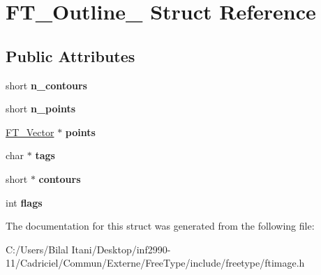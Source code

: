 \hypertarget{struct_f_t___outline__}{}\section{F\+T\+\_\+\+Outline\+\_\+ Struct Reference}
\label{struct_f_t___outline__}
\subsection*{Public Attributes}
\begin{DoxyCompactItemize}
\item 
short {\bfseries n\+\_\+contours}\hypertarget{struct_f_t___outline___a0313ba9c2c51f10e6b7d7ef97bd946e2}{}\label{struct_f_t___outline___a0313ba9c2c51f10e6b7d7ef97bd946e2}

\item 
short {\bfseries n\+\_\+points}\hypertarget{struct_f_t___outline___a7ebcf3c33231af88655534d1ac02b66e}{}\label{struct_f_t___outline___a7ebcf3c33231af88655534d1ac02b66e}

\item 
\hyperlink{struct_f_t___vector__}{F\+T\+\_\+\+Vector} $\ast$ {\bfseries points}\hypertarget{struct_f_t___outline___a4871896a2f38bdab947e30a7cf6bca04}{}\label{struct_f_t___outline___a4871896a2f38bdab947e30a7cf6bca04}

\item 
char $\ast$ {\bfseries tags}\hypertarget{struct_f_t___outline___ac84ca66907361e1f49ec11c14720087a}{}\label{struct_f_t___outline___ac84ca66907361e1f49ec11c14720087a}

\item 
short $\ast$ {\bfseries contours}\hypertarget{struct_f_t___outline___a218fdea14003061142ac1045ac50affa}{}\label{struct_f_t___outline___a218fdea14003061142ac1045ac50affa}

\item 
int {\bfseries flags}\hypertarget{struct_f_t___outline___a149765f0be0eab4fc82410cf853964bf}{}\label{struct_f_t___outline___a149765f0be0eab4fc82410cf853964bf}

\end{DoxyCompactItemize}


The documentation for this struct was generated from the following file\+:\begin{DoxyCompactItemize}
\item 
C\+:/\+Users/\+Bilal Itani/\+Desktop/inf2990-\/11/\+Cadriciel/\+Commun/\+Externe/\+Free\+Type/include/freetype/ftimage.\+h\end{DoxyCompactItemize}
